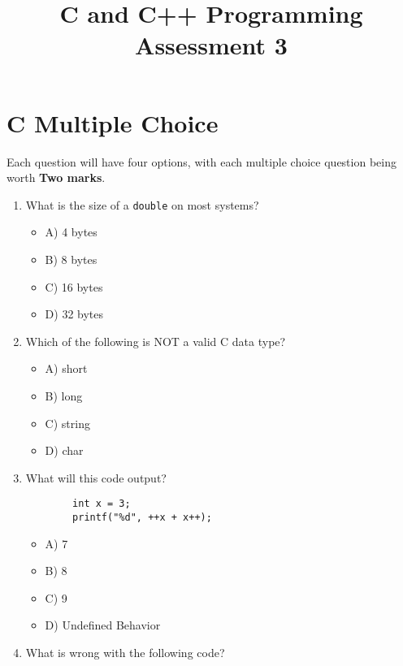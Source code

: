 \documentclass[a4paper,12pt]{article}
\begin{document}
\title{C and C++ Programming Assessment 3}
\maketitle

\newpage
\pagestyle{empty}

\section{C Multiple Choice}

Each question will have four options, with each multiple choice question being worth \textbf{Two marks}.

\begin{enumerate}
    \item What is the size of a \verb|double| on most systems?
    \begin{itemize}
        \item A) 4 bytes
        \item B) 8 bytes
        \item C) 16 bytes
        \item D) 32 bytes
    \end{itemize}

    \item Which of the following is NOT a valid C data type?
    \begin{itemize}
        \item A) short
        \item B) long
        \item C) string
        \item D) char
    \end{itemize}

    \item What will this code output?

    \lstset{language=C}
    \begin{lstlisting}
        int x = 3;
        printf("%d", ++x + x++);
    \end{lstlisting}    
    
    \begin{itemize}
        \item A) 7
        \item B) 8
        \item C) 9
        \item D) Undefined Behavior
    \end{itemize}

    \item What is wrong with the following code?


\end{enumerate}
\end{document}
